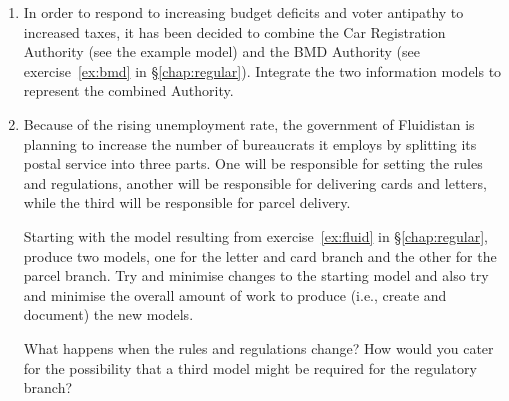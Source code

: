 \documentclass{article}
\newenvironment{exercises}{\begin{enumerate}}{\end{enumerate}}
\begin{document}
\begin{exercises}

\item In order to respond to increasing budget deficits and voter antipathy
      to increased taxes, it has been decided to combine the Car Registration
      Authority (see the example model) and the BMD Authority 
      (see exercise~\ref{ex:bmd} in \S\ref{chap:regular}).
      Integrate the two information models to represent
      the combined Authority.

\item Because of the rising unemployment rate, the government of Fluidistan
      is planning to increase the number of bureaucrats it employs by 
      splitting its postal service into three parts. One will be responsible 
      for setting the rules and regulations, another will be responsible 
      for delivering cards and letters, while the third will be responsible 
      for parcel delivery.

      Starting with the model resulting from exercise~\ref{ex:fluid}
      in \S\ref{chap:regular}, produce two models, 
      one for the letter and card branch and the other for
      the parcel branch. Try and minimise changes to the starting model 
      and also try and minimise the overall amount of work to produce
      (i.e., create and document) the new models.

      What happens when the rules and regulations change? How would you
      cater for the possibility that a third model might be required
      for the regulatory branch?

\end{exercises}
\end{document}
